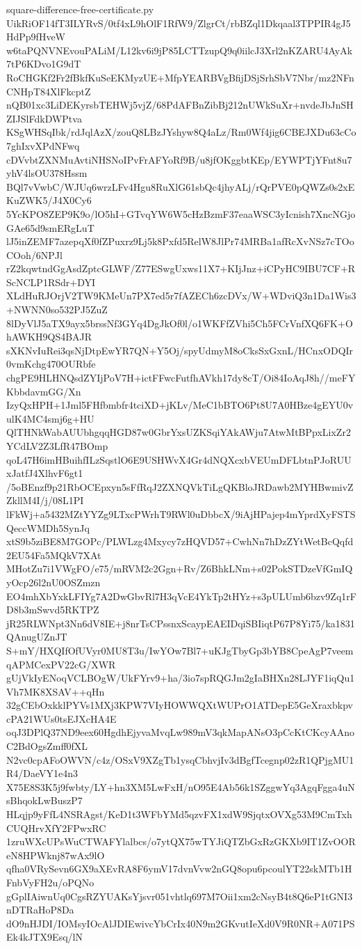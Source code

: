 \documentclass[11pt]{article}
\theoremstyle{definition}
\theoremstyle{remark}
\begin{document}
\begin{filecontents*}[overwrite]{square-difference-free-certificate.py}
UikRiOF14fT3ILYRvS/0tf4xL9hOlF1RfW9/ZlgrCt/rbBZql1Dkqaal3TPPIR4gJ5HdPp9fHveW
w6taPQNVNEvouPALiM/L12kv6i9jP85LCTTzupQ9q0iilcJ3Xrl2nKZARU4AyAk7tP6KDvo1G9dT
RoCHGKf2Fr2fBkfKuSeEKMyzUE+MfpYEARBVgBfijDSjSrhSbV7Nbr/mz2NFnCNHpT84XlFkcptZ
nQB01xc3LiDEKyrsbTEHWj5vjZ/68PdAFBnZibBj212nUWkSuXr+nvdeJbJnSHZIJSlFdkDWPtva
KSgWHSqIbk/rdJqlAzX/zouQ8LBzJYshyw8Q4aLz/Rm0Wf4jig6CBEJXDu63cCo7ghIxvXPdNFwq
cDVvbtZXNMuAvtiNHSNoIPvFrAFYoRf9B/u8jfOKggbtKEp/EYWPTjYFnt8u7yhV4lsOU378Hssm
BQl7vVwbC/WJUq6wrzLFv4Hgu8RuXlG61sbQc4jhyALj/rQrPVE0pQWZs0s2xEKuZWK5/J4X0Cy6
5YcKPO8ZEP9K9o/lO5hI+GTvqYW6W5cHzBzmF37eaaWSC3yIcnish7XncNGjoGAe65d9smERgLuT
lJ5inZEMF7azepqXf0fZPuxrz9Lj5k8Pxfd5RelW8JlPr74MRBa1afRcXvNSz7cTOoCOoh/6NPJl
rZ2kqwtndGgAsdZptcGLWF/Z77ESwgUxws11X7+KIjJnz+iCPyHC9IBU7CF+RScNCLP1RSdr+DYI
XLdHuRJOrjV2TW9KMeUn7PX7ed5r7fAZECh6zcDVx/W+WDviQ3n1Da1Wis3+NWNN0so532PJ5ZuZ
8lDyVlJ5aTX9ayx5brssNf3GYq4DgJkOf0l/o1WKFfZVhi5Ch5FCrVnfXQ6FK+OhAWKH9QS4BAJR
sXKNvIuRei3qsNjDtpEwYR7QN+Y5Oj/spyUdmyM8oCksSxGxnL/HCnxODQIr0vmKchg470OURbfe
chgPE9HLHNQsdZYIjPoV7H+ictFFwcFutfhAVkh17dy8cT/Oi84IoAqJ8h//meFYKbbdavmGG/Xn
IzyQxHPH+1Jml5FHfbmbfr4tciXD+jKLv/MeC1bBTO6Pt8U7A0HBze4gEYU0vulK4MC4smj6g+HU
QlTHNkWabAUUbhgqqHGD87w0GbrYxsUZKSqiYAkAWju7AtwMtBPpxLixZr2YCdLV2Z3LfR47BOmp
qoL47H6imHBuihfILzSqstlO6E9USHWvX4Gr4dNQXcxbVEUmDFLbtnPJoRUUxJatfJ4XlhvF6gt1
/5oBEnzf9p21RbOCEpxyn5sFfRqJ2ZXNQVkTiLgQKBloJRDawb2MYHBwmivZZkllM4I/j/08L1PI
lFkWj+a5432MZtYYZg9LTxcPWrhT9RWl0uDbbcX/9iAjHPajep4mYprdXyFSTSQeccWMDh5SynJq
xtS9b5ziBE8M7GOPc/PLWLzg4Mxycy7zHQVD57+CwhNn7hDzZYtWetBcQqfd2EU54Fa5MQkV7XAt
MHotZu7i1VWgFO/e75/mRVM2c2Ggn+Rv/Z6BhkLNm+s02PokSTDzeVfGmIQyOcp26l2nU0OSZmzn
EO4mhXbYxkLFIYg7A2DwGbvRl7H3qVcE4YkTp2tHYz+s3pULUmb6bzv9Zq1rFD8b3mSwvd5RKTPZ
jR25RLWNpt3Nn6dV8IE+j8nrTsCPssnxScaypEAEIDqiSBIiqtP67P8Yi75/ka1831QAnugUZnJT
S+mY/HXQIfOfUVyr0MU8T3u/IwYOw7Bl7+uKJgTbyGp3bYB8CpeAgP7veemqAPMCexPV22cG/XWR
gUjVkIyENoqVCLBOgW/UkFYrv9+ha/3io7spRQGJm2gIaBHXn28LJYF1iqQu1Vh7MK8XSAV++qHn
32gCEbOxkklPYVs1MXj3KPW7VIyHOWWQXtWUPrO1ATDepE5GeXraxbkpvcPA21WUs0tsEJXcHA4E
oqJ3DPlQ37ND9eex60HgdhEjyvaMvqLw989mV3qkMapANsO3pCcKtCKcyAAnoC2BdOgsZmff0fXL
N2vc0cpAFoOWVN/c4z/OSxV9XZgTb1ysqCbhvjIv3dBgfTcegnp02zR1QPjgMU1R4/DaeVY1e4n3
X75E8S3K5j9fwbty/LY+hn3XM5LwFxH/nO95E4Ab56k1SZggwYq3AgqFgga4uNsBhqokLwBuszP7
HLqjp9yFfL4NSRAgst/KeD1t3WFbYMd5qzvFX1xdW9SjqtxOVXg53M9CmTxhCUQHrvXfY2FPwxRC
1zruWXcUPsWuCTWAFYlalbcs/o7ytQX75wTYJiQTZbGxRzGKXb9IT1ZvOOReN8HPWknj87wAx9lO
qfha0VRySevn6GX9aXEvRA8F6ymV17dvnVvw2nGQ8opu6pcoulYT22skMTb1HFnbVyFH2u/oPQNo
gGplIAiwnUq0CgsRZYUAKsYjsvr051vhtlq697M7Oii1xm2cNsyB4t8Q6eP1tGNI3nDTRaHoP8Da
dO9nHJDI/IOMsyIOcAlJDIEwivcYbCrIx40N9m2GKvutIeXd0V9R0NR+A071PSEk4kJTX9Esq/lN

\end{filecontents*}
\end{document}
